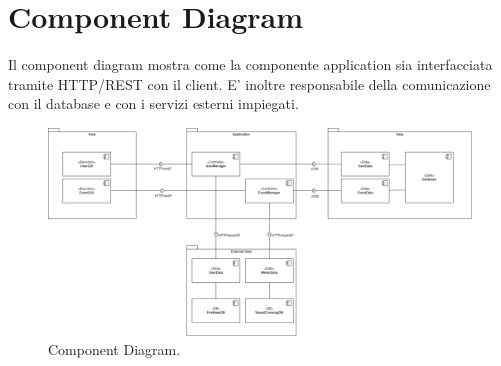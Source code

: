 \section{Component Diagram} 
Il component diagram mostra come la componente application sia interfacciata tramite HTTP/REST con il client. E' inoltre responsabile 
della comunicazione con il database e con i servizi esterni impiegati.
\begin{figure}[h!]
	\centering
	\includegraphics[width=0.8\linewidth]{Iterazione 1/diagrammi/Component.drawio.png}
	\caption{Component Diagram.}
	\label{fig:ComponentDiagram}
\end{figure}
